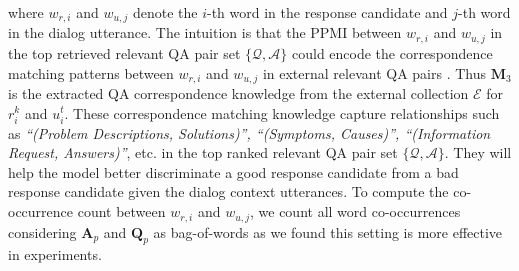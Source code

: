 where $w_{r,i}$ and $w_{u,j}$ denote the $i$-th word in the response candidate and $j$-th word in the dialog utterance.  The intuition is that the PPMI between $w_{r,i}$ and $w_{u,j}$ in the top retrieved relevant QA pair set $\{\mathcal{Q}, \mathcal{A}  \}$ could encode the correspondence matching patterns between $w_{r,i}$ and $w_{u,j}$ in external relevant QA pairs . Thus $\mathbf{M}_3$ is the extracted QA correspondence  knowledge from the external collection $\mathcal{E}$ for $r_i^k$ and $u_i^t$. These correspondence matching knowledge capture relationships such as \textit{``(Problem Descriptions, Solutions)'', ``(Symptoms, Causes)'', ``(Information Request, Answers)''}, etc. in  the top ranked relevant QA pair set $\{\mathcal{Q}, \mathcal{A}  \}$. They will help the model better discriminate a good response candidate from a bad response candidate given the dialog context utterances. To compute the co-occurrence count between $w_{r,i}$ and $w_{u,j}$, we count all word co-occurrences considering $\mathbf{A}_p$ and $\mathbf{Q}_p$ as bag-of-words as we found this setting is more effective in experiments.

